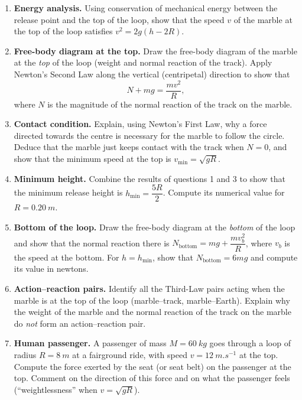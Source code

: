 \documentclass[11pt]{article}
\newcounter{popsec}
\newcounter{popsub}
\newcommand{\courssub}[1]{%
  \stepcounter{popsub}%
  \par\vspace{9pt}\noindent{\popxbold\fontsize{11.5}{13}\selectfont\color{popink}{\color{poporange}\thepopsec.\thepopsub}\hspace{6pt}#1}\par\nopagebreak\vspace{4pt}
}
\begin{document}
\courssub{Tasks}

\begin{enumerate}
\item \textbf{Energy analysis.} Using conservation of mechanical energy between the release point and the top of the loop, show that the speed $v$ of the marble at the top of the loop satisfies $v^2 = 2g(h - 2R)$.

\item \textbf{Free-body diagram at the top.} Draw the free-body diagram of the marble at the \emph{top} of the loop (weight and normal reaction of the track). Apply Newton's Second Law along the vertical (centripetal) direction to show that
\[ N + mg = \frac{mv^2}{R}, \]
where $N$ is the magnitude of the normal reaction of the track on the marble.

\item \textbf{Contact condition.} Explain, using Newton's First Law, why a force directed towards the centre is necessary for the marble to follow the circle. Deduce that the marble just keeps contact with the track when $N = 0$, and show that the minimum speed at the top is $v_{\min} = \sqrt{gR}$.

\item \textbf{Minimum height.} Combine the results of questions 1 and 3 to show that the minimum release height is $h_{\min} = \dfrac{5R}{2}$. Compute its numerical value for $R = \SI{0.20}{m}$.

\item \textbf{Bottom of the loop.} Draw the free-body diagram at the \emph{bottom} of the loop and show that the normal reaction there is $N_{\text{bottom}} = mg + \dfrac{mv_b^2}{R}$, where $v_b$ is the speed at the bottom. For $h = h_{\min}$, show that $N_{\text{bottom}} = 6mg$ and compute its value in newtons.

\item \textbf{Action--reaction pairs.} Identify all the Third-Law pairs acting when the marble is at the top of the loop (marble--track, marble--Earth). Explain why the weight of the marble and the normal reaction of the track on the marble do \emph{not} form an action--reaction pair.

\item \textbf{Human passenger.} A passenger of mass $M = \SI{60}{kg}$ goes through a loop of radius $R = \SI{8}{m}$ at a fairground ride, with speed $v = \SI{12}{m.s^{-1}}$ at the top. Compute the force exerted by the seat (or seat belt) on the passenger at the top. Comment on the direction of this force and on what the passenger feels (``weightlessness'' when $v = \sqrt{gR}$).


\end{enumerate}
\end{document}
